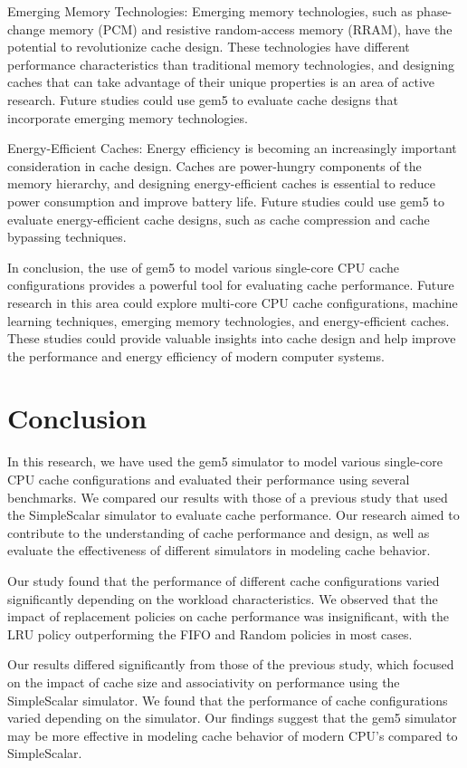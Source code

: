 \documentclass[conference]{IEEEtran}
\begin{document}
Emerging Memory Technologies: Emerging memory technologies, such as phase-change memory (PCM) and resistive random-access memory (RRAM), have the potential to revolutionize cache design. These technologies have different performance characteristics than traditional memory technologies, and designing caches that can take advantage of their unique properties is an area of active research. Future studies could use gem5 to evaluate cache designs that incorporate emerging memory technologies.

Energy-Efficient Caches: Energy efficiency is becoming an increasingly important consideration in cache design. Caches are power-hungry components of the memory hierarchy, and designing energy-efficient caches is essential to reduce power consumption and improve battery life. Future studies could use gem5 to evaluate energy-efficient cache designs, such as cache compression and cache bypassing techniques.

In conclusion, the use of gem5 to model various single-core CPU cache configurations provides a powerful tool for evaluating cache performance. Future research in this area could explore multi-core CPU cache configurations, machine learning techniques, emerging memory technologies, and energy-efficient caches. These studies could provide valuable insights into cache design and help improve the performance and energy efficiency of modern computer systems.

\section{Conclusion}
In this research, we have used the gem5 simulator to model various single-core CPU cache configurations and evaluated their performance using several benchmarks. We compared our results with those of a previous study that used the SimpleScalar simulator to evaluate cache performance. Our research aimed to contribute to the understanding of cache performance and design, as well as evaluate the effectiveness of different simulators in modeling cache behavior.

Our study found that the performance of different cache configurations varied significantly depending on the workload characteristics. We observed that the impact of replacement policies on cache performance was insignificant, with the LRU policy outperforming the FIFO and Random policies in most cases.

Our results differed significantly from those of the previous study, which focused on the impact of cache size and associativity on performance using the SimpleScalar simulator. We found that the performance of cache configurations varied depending on the simulator. Our findings suggest that the gem5 simulator may be more effective in modeling cache behavior of modern CPU's compared to SimpleScalar.
\end{document}
